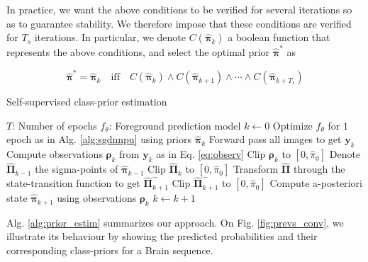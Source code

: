 In practice, we want the above conditions to be verified for several iterations so as to guarantee stability.
We therefore impose that these conditions are verified for $T_{s}$ iterations.
In particular, we denote $C(\bm{\hat \pi}_{k})$ a boolean function that represents the above conditions, and select the optimal prior $\bm{\hat \pi}^{*}$ as

\begin{equation}
  \label{eq:prior_opt}
  \bm{\hat \pi}^{*} = \bm{\hat \pi}_{k} \quad \text{iff} \quad C(\bm{\hat \pi}_{k}) \wedge
  C(\bm{\hat \pi}_{k+1})
  \wedge \cdots \wedge  C(\bm{\hat \pi}_{k+T_{s}})
\end{equation}


\begin{algorithm}[H]
\caption{Self-supervised class-prior estimation}
\label{alg:prior_estim}
\begin{algorithmic}
 \newline
  $T$: Number of epochs \newline
  $f_\theta$: Foreground prediction model
\State $k \gets 0$
    \State Optimize $f_\theta$ for $1$ epoch as in Alg. \ref{alg:sgdnnpu} using priors $\bm{\hat{\pi}}_{k}$
    \State Forward pass all images to get $\bm{y}_k$
    \State Compute observations $\bm{\rho}_k$ from $\bm{y}_{k}$ as in Eq. \ref{eq:observ}
    \State Clip $\bm{\rho}_{k}$ to $[0,\hat \pi_{0}]$
    \State Denote $\bm{\hat\Pi}_{k-1}$ the sigma-points of $\bm{\hat\pi}_{k-1}$
    \State Clip $\bm{\hat\Pi}_{k}$ to $[0, \hat \pi_{0}]$
    \State Transform $\bm{\hat\Pi}$ through the state-transition function to get $\bm{\hat\Pi}_{k+1}^{-}$
    \State Clip $\bm{\hat\Pi}_{k+1}^{-}$ to $[0, \hat \pi_{0}]$
    \State Compute a-posteriori state $\bm{\hat\pi}_{k+1}$ using observations $\bm{\rho}_{k}$
    \State $k \gets k+1$
\EndWhile
\end{algorithmic}
\end{algorithm}

Alg. \ref{alg:prior_estim} summarizes our approach.
On Fig. \ref{fig:prevs_conv}, we illustrate its behaviour by showing the predicted probabilities and their corresponding class-priors for a Brain sequence.

